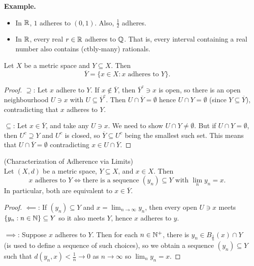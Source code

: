 \documentclass[14pt,oneside]{extarticle}
\newenvironment{example}{
    \par
    \vspace{5pt}
    \noindent\textbf{Example.}
    \begin{tcolorbox}[
        blanker, breakable, left=5mm, parbox=false,
        before upper={\parindent15pt},
        after skip=10pt,
        borderline west={1mm}{0pt}{solarized-magenta!50}]
}{
    \end{tcolorbox}
    \vspace{5pt}
}
\begin{document}
\begin{example}
  \begin{itemize}[label=$\circ$, leftmargin=*, itemsep=1em]
    \item In $\mathbb{R}$, $1$ adheres to $(0,1)$. Also, $\frac{1}{2}$ adheres.
    \item In $\mathbb{R}$, every real $r \in \mathbb{R}$ adheres to $\mathbb{Q}$. That is, every interval containing a real number also contains (ctbly-many) rationals.
  \end{itemize}
\end{example}

\begin{proposition*}
  Let $X$ be a metric space and $Y \subseteq X$. Then 
  \[\overline{Y} = \{x \in X : x \text{ adheres to } Y\}.\]
\end{proposition*}
\begin{proof}
  $\supseteq$: Let $x$ adhere to $Y$. If $x \notin \overline{Y}$, then $\overline{Y}^c \ni x$ is open, so there is an open neighbourhood $U \ni x$ with $U \subseteq \overline{Y}^c$. Then $U \cap \overline{Y} = \emptyset$ hence $U \cap Y = \emptyset$ (since $Y \subseteq \overline{Y}$), contradicting that $x$ adheres to $Y$.

  $\subseteq$: Let $x \in \overline{Y}$, and take any $U \ni x$. We need to show $U \cap Y \neq \emptyset$. But if $U \cap Y = \emptyset$, then $U^c \supseteq Y$ and $U^c$ is closed, so $\overline{Y} \subseteq U^c$ being the smallest such set. This means that $U \cap \overline{Y} = \emptyset$ contradicting $x \in U \cap \overline{Y}$.
  \pic
\end{proof}

\begin{proposition*} (Characterization of Adherence via Limits) \\
  Let $(X,d)$ be a metric space, $Y \subseteq X$, and $x \in X$. Then 
  \[x \text{ adheres to } Y \iff \text{there is a sequence $(y_n) \subseteq Y$ with $\lim_n y_n = x$}.\]
In particular, both are equivalent to $x \in \overline{Y}$.
\end{proposition*}
\begin{proof}
  $\impliedby$: If $(y_n) \subseteq Y$ and $x = \lim_{n \to \infty} y_n$, then every open $U \ni x$ meets $\{y_n: n \in \mathbb{N}\} \subseteq Y$ so it also meets $Y$, hence $x$ adheres to $y$.

  $\implies$: Suppose $x$ adheres to $Y$. Then for each $n \in \mathbb{N}^+$, there is $y_n \in B_{\frac 1 n}(x) \cap Y$ (\AC is used to define a sequence of such choices), so we obtain a sequence $(y_n ) \subseteq Y$ such that $d(y_n, x) < \frac 1 n \to 0$ as $n \to \infty$ so $\lim_n y_n = x$.
\end{proof}
\end{document}
